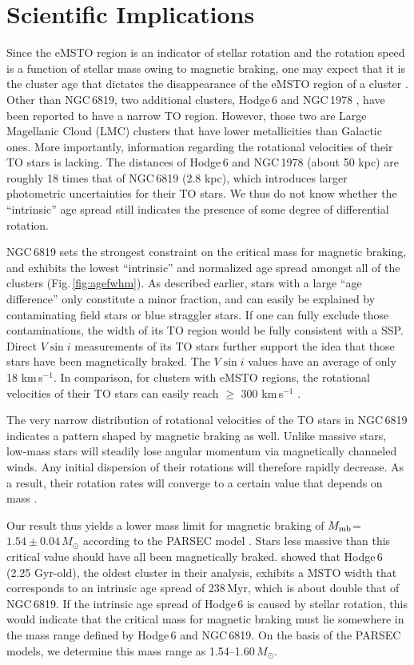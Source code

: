 \documentclass[twocolumn]{aastex631}
\begin{document}
\section{Scientific Implications}
Since the eMSTO region is an indicator of stellar rotation and the rotation speed is a function of stellar mass owing to magnetic braking, one may expect that it is the cluster age that dictates the disappearance of the eMSTO region of a cluster \citep{georgy2019disappearance}. Other than NGC\,6819, two additional clusters,  Hodge\,6 \citep{goudfrooij2014extended} and NGC\,1978 \citep{2018MNRAS.477.4696M}, have been reported to have a narrow TO region. However, those two are Large Magellanic Cloud (LMC) clusters that have lower metallicities than Galactic ones. More importantly, information regarding the rotational velocities of their TO stars is lacking. The distances of Hodge\,6 and NGC\,1978 (about 50 kpc) are roughly 18 times that of NGC\,6819 (2.8 kpc), which introduces larger photometric uncertainties for their TO stars. We thus do not know whether the ``intrinsic'' age spread still indicates the presence of some degree of differential rotation. 

NGC\,6819 sets the strongest constraint on the critical mass for magnetic braking, and exhibits the lowest ``intrinsic'' and normalized age spread amongst all of the clusters (Fig.\,\ref{fig:agefwhm}). As described earlier, stars with a large ``age difference'' only constitute a minor fraction, and can easily be explained by contaminating field stars or blue straggler stars. If one can fully exclude those contaminations, the width of its TO region would be fully consistent with a SSP. Direct $V\sin{i}$ measurements of its TO stars further support the idea that those stars have been magnetically braked. The $V\sin{i}$ values have an average of only 18 km$\,$s$^{-1}$. In comparison, for clusters with eMSTO regions, the rotational velocities of their TO stars can easily reach $\ge$ 300 km$\,$s$^{-1}$  \citep{2019ApJ...876...65L}. 

The very narrow distribution of rotational velocities of the TO stars in NGC\,6819 indicates a pattern shaped by magnetic braking as well. Unlike massive stars, low-mass stars will steadily lose angular momentum via magnetically channeled winds. Any initial dispersion of their rotations will therefore rapidly decrease. As a result, their rotation rates will converge to a certain value that depends on mass \citep{2015Natur.517..589M}. 

Our result thus yields a lower mass limit for magnetic braking of $M_{\rm mb}$=$1.54\pm 0.04\,M_{\odot}$  according to the PARSEC model \citep{2012MNRAS.427..127B, Marigo2017A}. Stars less massive than this critical value should have all been magnetically braked. \citet{goudfrooij2014extended} showed that Hodge\,6 (2.25 Gyr-old), the oldest cluster in their analysis, exhibits a MSTO width that corresponds to an intrinsic age spread of 238\,Myr, which is about double that of NGC\,6819. If the intrinsic age spread of Hodge\,6 is caused by stellar rotation, this would indicate that the critical mass for magnetic braking must lie somewhere in the mass range defined by Hodge\,6 and NGC\,6819. On the basis of the PARSEC models, we determine this mass range as 1.54--1.60\,$M_{\odot}$. 
\end{document}
